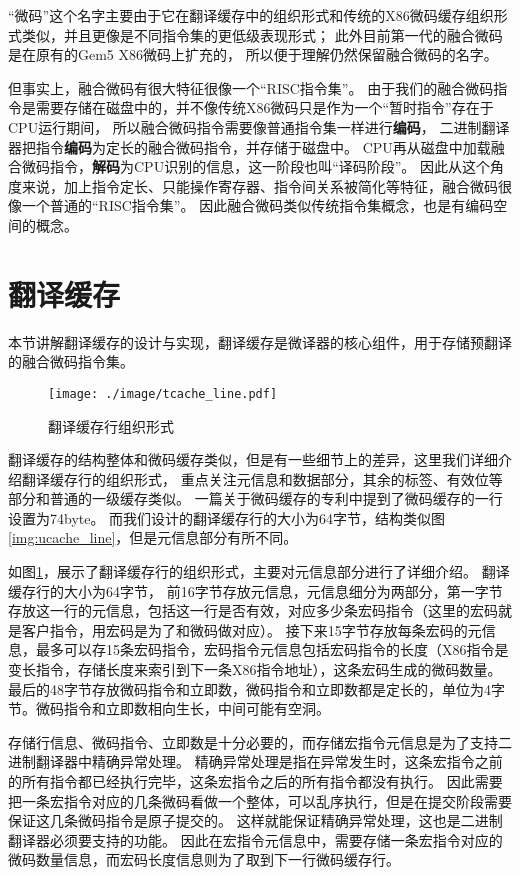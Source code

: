 “微码”这个名字主要由于它在翻译缓存中的组织形式和传统的X86微码缓存组织形式类似，并且更像是不同指令集的更低级表现形式；
此外目前第一代的融合微码是在原有的Gem5 X86微码上扩充的，
所以便于理解仍然保留融合微码的名字。

但事实上，融合微码有很大特征很像一个“RISC指令集”。
由于我们的融合微码指令是需要存储在磁盘中的，并不像传统X86微码只是作为一个“暂时指令”存在于CPU运行期间，
所以融合微码指令需要像普通指令集一样进行\textbf{编码}，
二进制翻译器把指令\textbf{编码}为定长的融合微码指令，并存储于磁盘中。
CPU再从磁盘中加载融合微码指令，\textbf{解码}为CPU识别的信息，这一阶段也叫“译码阶段”。
因此从这个角度来说，加上指令定长、只能操作寄存器、指令间关系被简化等特征，融合微码很像一个普通的“RISC指令集”。
因此融合微码类似传统指令集概念，也是有编码空间的概念。

\section{翻译缓存}

本节讲解翻译缓存的设计与实现，翻译缓存是微译器的核心组件，用于存储预翻译的融合微码指令集。

\begin{figure}[h]
  \centering
  \texttt{[image: ./image/tcache\_line.pdf]}
  \caption{翻译缓存行组织形式}
  \label{img:tcache_line}
\end{figure}

翻译缓存的结构整体和微码缓存类似，但是有一些细节上的差异，这里我们详细介绍翻译缓存行的组织形式，
重点关注元信息和数据部分，其余的标签、有效位等部分和普通的一级缓存类似。
一篇关于微码缓存的专利\cite{uopPatent}中提到了微码缓存的一行设置为74byte。
而我们设计的翻译缓存行的大小为64字节，结构类似图\ref{img:ucache_line}，但是元信息部分有所不同。

如图\ref{img:tcache_line}，展示了翻译缓存行的组织形式，主要对元信息部分进行了详细介绍。
翻译缓存行的大小为64字节，
前16字节存放元信息，元信息细分为两部分，第一字节存放这一行的元信息，包括这一行是否有效，对应多少条宏码指令（这里的宏码就是客户指令，用宏码是为了和微码做对应）。
接下来15字节存放每条宏码的元信息，最多可以存15条宏码指令，宏码指令元信息包括宏码指令的长度（X86指令是变长指令，存储长度来索引到下一条X86指令地址），这条宏码生成的微码数量。
最后的48字节存放微码指令和立即数，微码指令和立即数都是定长的，单位为4字节。微码指令和立即数相向生长，中间可能有空洞。

存储行信息、微码指令、立即数是十分必要的，而存储宏指令元信息是为了支持二进制翻译器中精确异常处理。
精确异常处理是指在异常发生时，这条宏指令之前的所有指令都已经执行完毕，这条宏指令之后的所有指令都没有执行。
因此需要把一条宏指令对应的几条微码看做一个整体，可以乱序执行，但是在提交阶段需要保证这几条微码指令是原子提交的。
这样就能保证精确异常处理，这也是二进制翻译器必须要支持的功能。
因此在宏指令元信息中，需要存储一条宏指令对应的微码数量信息，而宏码长度信息则为了取到下一行微码缓存行。


